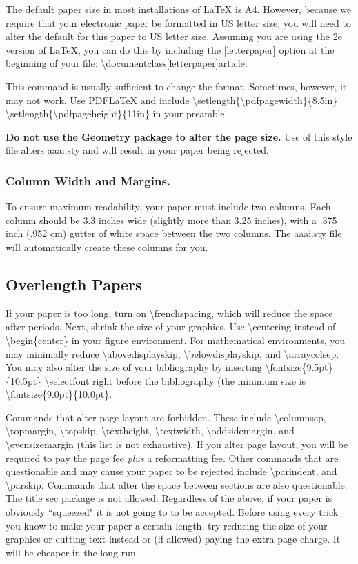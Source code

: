 \documentclass[letterpaper]{article}
\begin{document}
The default paper size in most installations of \LaTeX{} is A4. However, because we require that your electronic paper be formatted in US letter size, you will need to alter the default for this paper to US letter size. Assuming you are using the 2e version of \LaTeX{}, you can do this by including the [letterpaper] option at the beginning of your file: 
\textbackslash documentclass[letterpaper]{article}. 

This command is usually sufficient to change the format. Sometimes, however, it may not work. Use PDF\LaTeX{} and include
\textbackslash setlength\{\textbackslash pdfpagewidth\}\{8.5in\}
\textbackslash setlength\{\textbackslash pdfpageheight\}\{11in\}
in your preamble. 

\textbf{Do not use the Geometry package to alter the page size.} Use of this style file alters aaai.sty and will result in your paper being rejected. 


\subsubsection{Column Width and Margins.}
To ensure maximum readability, your paper must include two columns. Each column should be 3.3 inches wide (slightly more than 3.25 inches), with a .375 inch (.952 cm) gutter of white space between the two columns. The aaai.sty file will automatically create these columns for you. 

\subsection{Overlength Papers}
If your paper is too long, turn on \textbackslash frenchspacing, which will reduce the space after periods. Next,  shrink the size of your graphics. Use \textbackslash centering instead of \textbackslash begin\{center\} in your figure environment. For mathematical environments, you may minimally reduce \textbackslash abovedisplayskip, \textbackslash belowdisplayskip, and \textbackslash arraycolsep. You may also alter the size of your bibliography by inserting \textbackslash fontsize\{9.5pt\}\{10.5pt\} \textbackslash selectfont
right before the bibliography (the minimum size is \textbackslash fontsize\{9.0pt\}\{10.0pt\}. 

Commands that alter page layout are forbidden. These include \textbackslash columnsep, \textbackslash topmargin, \textbackslash topskip, \textbackslash textheight, \textbackslash textwidth, \textbackslash oddsidemargin, and \textbackslash evensizemargin (this list is not exhaustive). If you alter page layout, you will be required to pay the page fee \textit{plus} a reformatting fee. Other commands that are questionable and may cause your paper to be rejected include  \textbackslash parindent, and \textbackslash parskip. Commands that alter the space between sections are also questionable. The title sec package is not allowed. Regardless of the above, if your paper is obviously ``squeezed" it is not going to to be accepted. Before using every trick you know to make your paper a certain length, try reducing the size of your graphics or cutting text instead or (if allowed) paying the extra page charge. It will be cheaper in the long run.
\end{document}
